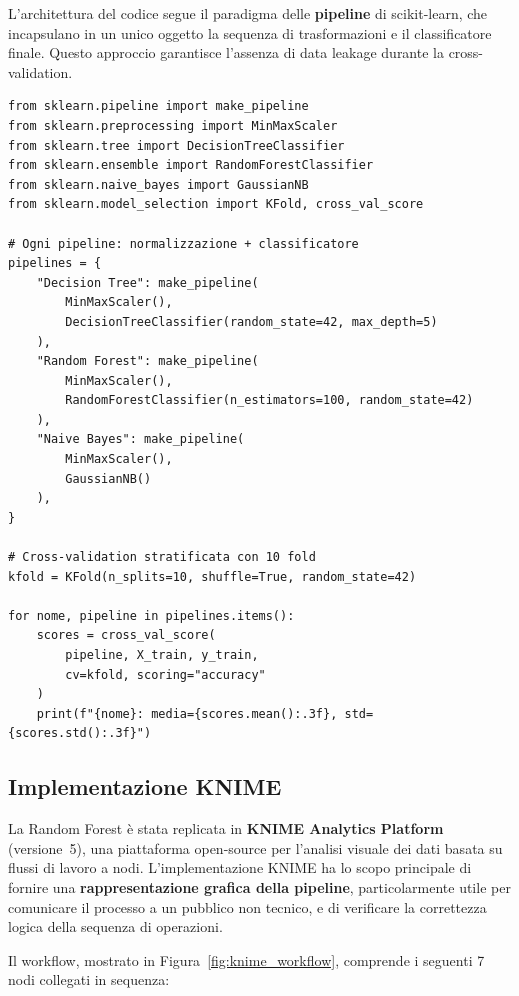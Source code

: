 \documentclass[12pt, a4paper]{article}
\begin{document}
L'architettura del codice segue il paradigma delle \textbf{pipeline} di
scikit-learn, che incapsulano in un unico oggetto la sequenza di trasformazioni
e il classificatore finale. Questo approccio garantisce l'assenza di data
leakage durante la cross-validation.

\begin{lstlisting}[caption={Definizione delle pipeline e cross-validation}, label={lst:pipeline}]
from sklearn.pipeline import make_pipeline
from sklearn.preprocessing import MinMaxScaler
from sklearn.tree import DecisionTreeClassifier
from sklearn.ensemble import RandomForestClassifier
from sklearn.naive_bayes import GaussianNB
from sklearn.model_selection import KFold, cross_val_score

# Ogni pipeline: normalizzazione + classificatore
pipelines = {
    "Decision Tree": make_pipeline(
        MinMaxScaler(),
        DecisionTreeClassifier(random_state=42, max_depth=5)
    ),
    "Random Forest": make_pipeline(
        MinMaxScaler(),
        RandomForestClassifier(n_estimators=100, random_state=42)
    ),
    "Naive Bayes": make_pipeline(
        MinMaxScaler(),
        GaussianNB()
    ),
}

# Cross-validation stratificata con 10 fold
kfold = KFold(n_splits=10, shuffle=True, random_state=42)

for nome, pipeline in pipelines.items():
    scores = cross_val_score(
        pipeline, X_train, y_train,
        cv=kfold, scoring="accuracy"
    )
    print(f"{nome}: media={scores.mean():.3f}, std={scores.std():.3f}")
\end{lstlisting}

\subsection{Implementazione KNIME}

La Random Forest è stata replicata in \textbf{KNIME Analytics Platform}
(versione~5), una piattaforma open-source per l'analisi visuale dei dati
basata su flussi di lavoro a nodi. L'implementazione KNIME ha lo scopo
principale di fornire una \textbf{rappresentazione grafica della pipeline},
particolarmente utile per comunicare il processo a un pubblico non tecnico,
e di verificare la correttezza logica della sequenza di operazioni.

Il workflow, mostrato in Figura~\ref{fig:knime_workflow}, comprende
i seguenti 7 nodi collegati in sequenza:
\end{document}
